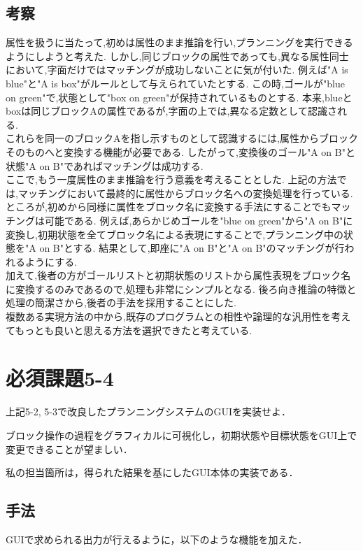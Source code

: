 \documentclass[uplatex,12pt]{jsarticle}
\begin{document}
\subsection{考察}
属性を扱うに当たって,初めは属性のまま推論を行い,プランニングを実行できるようにしようと考えた.
しかし,同じブロックの属性であっても,異なる属性同士において,字面だけではマッチングが成功しないことに気が付いた.
例えば"A is blue"と"A is box"がルールとして与えられていたとする.
この時,ゴールが"blue on green"で,状態として"box on green"が保持されているものとする.
本来,blueとboxは同じブロックAの属性であるが,字面の上では,異なる定数として認識される. \\
これらを同一のブロックAを指し示すものとして認識するには,属性からブロックそのものへと変換する機能が必要である.
したがって,変換後のゴール"A on B"と状態"A on B"であればマッチングは成功する. \\
ここで,もう一度属性のまま推論を行う意義を考えることとした.
上記の方法では,マッチングにおいて最終的に属性からブロック名への変換処理を行っている.
ところが,初めから同様に属性をブロック名に変換する手法にすることでもマッチングは可能である.
例えば,あらかじめゴールを"blue on green"から"A on B"に変換し,初期状態を全てブロック名による表現にすることで,プランニング中の状態を"A on B"とする.
結果として,即座に"A on B"と"A on B"のマッチングが行われるようにする. \\
加えて,後者の方がゴールリストと初期状態のリストから属性表現をブロック名に変換するのみであるので,処理も非常にシンプルとなる.
後ろ向き推論の特徴と処理の簡潔さから,後者の手法を採用することにした. \\
複数ある実現方法の中から,既存のプログラムとの相性や論理的な汎用性を考えてもっとも良いと思える方法を選択できたと考えている.


\section{必須課題5-4}
\begin{screen}
    上記5-2, 5-3で改良したプランニングシステムのGUIを実装せよ．\par
    ブロック操作の過程をグラフィカルに可視化し，初期状態や目標状態をGUI上で変更できることが望ましい．
\end{screen}
私の担当箇所は，得られた結果を基にしたGUI本体の実装である．

\subsection{手法}
GUIで求められる出力が行えるように，以下のような機能を加えた．
\end{document}
